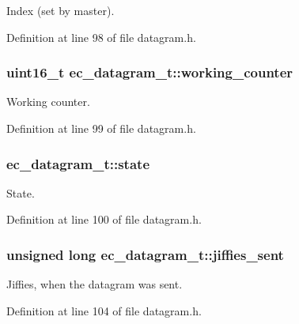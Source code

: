 \-Index (set by master). 



\-Definition at line 98 of file datagram.\-h.

\subsubsection[{working\-\_\-counter}]{\setlength{\rightskip}{0pt plus 5cm}uint16\-\_\-t {\bf ec\-\_\-datagram\-\_\-t\-::working\-\_\-counter}}\label{structec__datagram__t_a1eeebb1d33d0dbf47498dd78a966977d}


\-Working counter. 



\-Definition at line 99 of file datagram.\-h.

\subsubsection[{state}]{ {\bf ec\-\_\-datagram\-\_\-t\-::state}}\label{structec__datagram__t_a90d55e568be4b8464e9725c105d6c4b0}


\-State. 



\-Definition at line 100 of file datagram.\-h.

\subsubsection[{jiffies\-\_\-sent}]{\setlength{\rightskip}{0pt plus 5cm}unsigned long {\bf ec\-\_\-datagram\-\_\-t\-::jiffies\-\_\-sent}}\label{structec__datagram__t_a640ba704d00d50c33e930b6c641b55d7}


\-Jiffies, when the datagram was sent. 



\-Definition at line 104 of file datagram.\-h.


